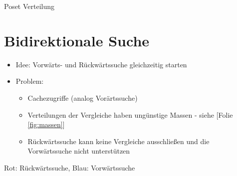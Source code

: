 \begin{frame}{Poset Verteilung}
  \begin{figure}[!b]
    \centering
    \resizebox{\textheight}{!}{%
      
    }
  \end{figure}
\end{frame}


\section{Bidirektionale Suche}
\sectionframe{\insertsection}
\begin{frame}{\insertsection}

  \begin{itemize}
    \item<+-> Idee: Vorwärts- und Rückwärtssuche gleichzeitig starten
    \item<+-> Problem:
      \begin{itemize}
        \item<+-> Cachezugriffe (analog Vorärtssuche)
        \item<+-> Verteilungen der Vergleiche haben ungünstige Massen - siehe [Folie \ref{fig:massen}]
        \item<+-> Rückwärtssuche kann keine Vergleiche ausschließen und die Vorwärtssuche nicht unterstützen
      \end{itemize}
  \end{itemize}
\end{frame}

\begin{frame}{\insertsection}
  \begin{figure}[!b]
    \centering
    \renewcommand{\arraystretch}{0.9}
    \resizebox{0.85\textheight}{!}{%
      
      \label{fig:massen}
    }
  \end{figure}

  {\color{red} Rot: Rückwärtssuche},
  {\color{blue} Blau: Vorwärtssuche}

\end{frame}


